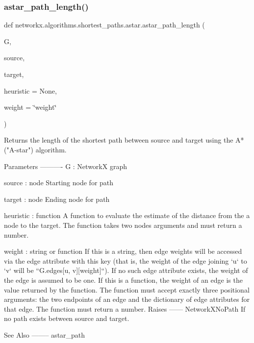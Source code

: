 \subsubsection{\texorpdfstring{astar\+\_\+path\+\_\+length()}{astar\_path\_length()}}
{\footnotesize\ttfamily def networkx.\+algorithms.\+shortest\+\_\+paths.\+astar.\+astar\+\_\+path\+\_\+length (\begin{DoxyParamCaption}\item[{}]{G,  }\item[{}]{source,  }\item[{}]{target,  }\item[{}]{heuristic = {\ttfamily None},  }\item[{}]{weight = {\ttfamily \char`\"{}weight\char`\"{}} }\end{DoxyParamCaption})}

\begin{DoxyVerb}Returns the length of the shortest path between source and target using
the A* ("A-star") algorithm.

Parameters
----------
G : NetworkX graph

source : node
   Starting node for path

target : node
   Ending node for path

heuristic : function
   A function to evaluate the estimate of the distance
   from the a node to the target.  The function takes
   two nodes arguments and must return a number.

weight : string or function
   If this is a string, then edge weights will be accessed via the
   edge attribute with this key (that is, the weight of the edge
   joining `u` to `v` will be ``G.edges[u, v][weight]``). If no
   such edge attribute exists, the weight of the edge is assumed to
   be one.
   If this is a function, the weight of an edge is the value
   returned by the function. The function must accept exactly three
   positional arguments: the two endpoints of an edge and the
   dictionary of edge attributes for that edge. The function must
   return a number.
Raises
------
NetworkXNoPath
    If no path exists between source and target.

See Also
--------
astar_path\end{DoxyVerb}
 